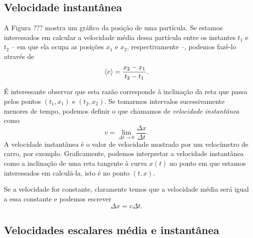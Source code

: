 \subsection{Velocidade instantânea}

A Figura ??? mostra um gráfico da posição de uma partícula. Se estamos interessados em calcular a velocidade média dessa partícula entre os instantes $t_1$ e $t_2$ -- em que ela ocupa as posições $x_1$ e $x_2$, respectivamente --, podemos fazê-lo através de
\begin{equation}
  \left\langle{v}\right\rangle = \frac{x_2 - x_1}{t_2 - t_1}.
\end{equation}

É interessante observar que esta razão corresponde à inclinação da reta que passa pelos pontos $(t_1,x_1)$ e $(t_2,x_2)$. Se tomarmos intervalos sucessivamente menores de tempo, podemos definir o que chamamos de \emph{velocidade instantânea} como 
\begin{equation}
  v = \lim_{\Delta t \to 0} \frac{\Delta x}{\Delta t}.
\end{equation}
%
A velocidade instantânea é o valor de velocidade mostrado por um velocímetro de carro, por exemplo. Graficamente, podemos interpretar a velocidade instantânea como a inclinação de uma reta tangente à curva $x(t)$ no ponto em que estamos interessados em calculá-la, isto é no ponto $(t,x)$.


Se a velocidade for constante, claramente temos que a velocidade média será igual a essa constante e podemos escrever
\begin{equation}
  \Delta x = v \Delta t.
\end{equation}


\subsection{Velocidades escalares média e instantânea}

